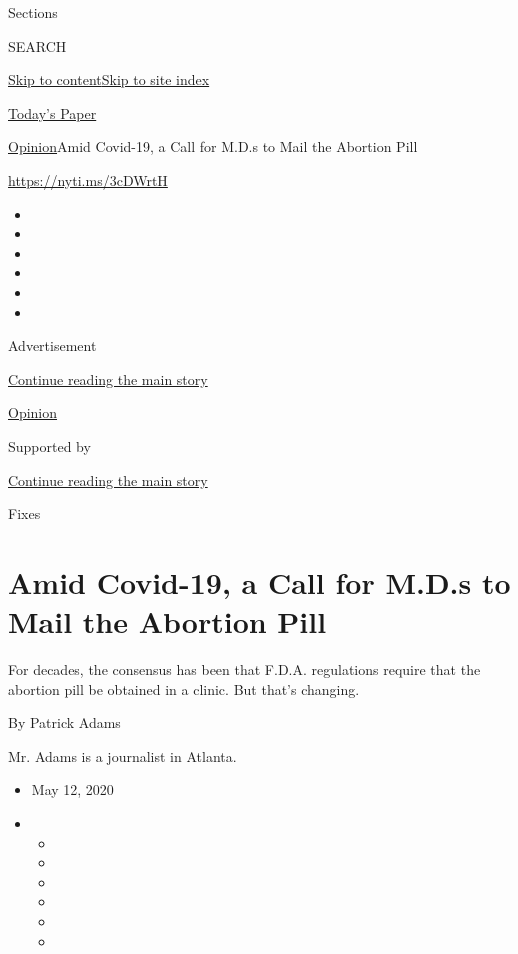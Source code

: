 Sections

SEARCH

\protect\hyperlink{site-content}{Skip to
content}\protect\hyperlink{site-index}{Skip to site index}

\href{https://myaccount.nytimes.com/auth/login?response_type=cookie\&client_id=vi}{}

\href{https://www.nytimes.com/section/todayspaper}{Today's Paper}

\href{/section/opinion}{Opinion}\textbar{}Amid Covid-19, a Call for
M.D.s to Mail the Abortion Pill

\href{https://nyti.ms/3cDWrtH}{https://nyti.ms/3cDWrtH}

\begin{itemize}
\item
\item
\item
\item
\item
\item
\end{itemize}

Advertisement

\protect\hyperlink{after-top}{Continue reading the main story}

\href{/section/opinion}{Opinion}

Supported by

\protect\hyperlink{after-sponsor}{Continue reading the main story}

Fixes

\hypertarget{amid-covid-19-a-call-for-mds-to-mail-the-abortion-pill}{%
\section{Amid Covid-19, a Call for M.D.s to Mail the Abortion
Pill}\label{amid-covid-19-a-call-for-mds-to-mail-the-abortion-pill}}

For decades, the consensus has been that F.D.A. regulations require that
the abortion pill be obtained in a clinic. But that's changing.

By Patrick Adams

Mr. Adams is a journalist in Atlanta.

\begin{itemize}
\item
  May 12, 2020
\item
  \begin{itemize}
  \item
  \item
  \item
  \item
  \item
  \item
  \end{itemize}
\end{itemize}

